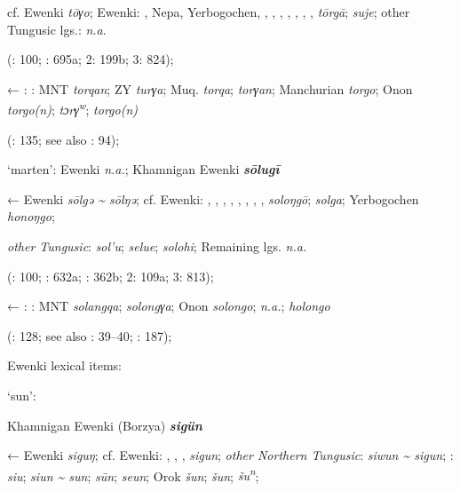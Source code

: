 \documentclass[output=paper,colorlinks,citecolor=brown]{langscibook}
\begin{document}
    cf.  Ewenki \textit{tōγo};  Ewenki: , Nepa, Yerbogochen, , , , , , , ,  \textit{tōrgā};  \textit{suje}; other Tungusic lgs.: \textit{n.a}.
    
    (\citealt{Janhunen1991}: 100; \citealt{Dorji1998}: 695a; \citealt{Cincius1975B} 2: 199b; \citealt{Hauer1952} 3: 824);

    ← : : MNT \textit{torqan}; ZY \textit{turγa}; Muq. \textit{torqa};  \textit{torγan}; Manchurian  \textit{torgo}; Onon  \textit{torgo(n)};  \textit{tɔrγ\textsuperscript{w}};  \textit{torgo(n)} 
    
    (\citealt{Khabtagaeva2017}: 135; see also \citealt{Doerfer1985}: 94);

    \ex ‘marten’:  Ewenki \textit{n.a.}; Khamnigan Ewenki \textbf{\textit{sōlugī}}

    ←  Ewenki \textit{sōlgǝ {\textasciitilde} sōlŋǝ}; cf.  Ewenki: , , , , , , , ,  \textit{soloŋgō};  \textit{solga}; Yerbogochen \textit{honoŋgo};

    \textit{other Tungusic}:  \textit{sol’u};  \textit{selue};  \textit{solohi}; Remaining lgs. \textit{n.a.} 
    
    (\citealt{Janhunen1991}: 100; \citealt{Dorji1998}: 632a; \citealt{Vasilevic1958}: 362b; \citealt{Cincius1975B} 2: 109a; \citealt{Hauer1952} 3: 813);

    ← : : MNT \textit{solangqa};  \textit{solongγa}; Onon  \textit{solongo};  \textit{n.a.};  \textit{holongo}
    
    (\citealt{Khabtagaeva2017}: 128; see also \citealt{Doerfer1985}: 39--40; \citealt{Rozycki1994}: 187);
\z


\ea
{} Ewenki lexical items:


\ea ‘sun’:

\ea {}Khamnigan Ewenki (Borzya) \textbf{\textit{sigün}}

    ←  Ewenki \textit{siguŋ}; cf.  Ewenki: , , ,  \textit{sigun}; \textit{other Northern Tungusic}:  \textit{siwun {\textasciitilde} sigun}; \textit{}:  \textit{siu};  \textit{siun {\textasciitilde} sun};  \textit{sūn};  \textit{seun}; Orok \textit{šun};  \textit{šun};  \textit{šu\textsuperscript{n}};
\end{document}
